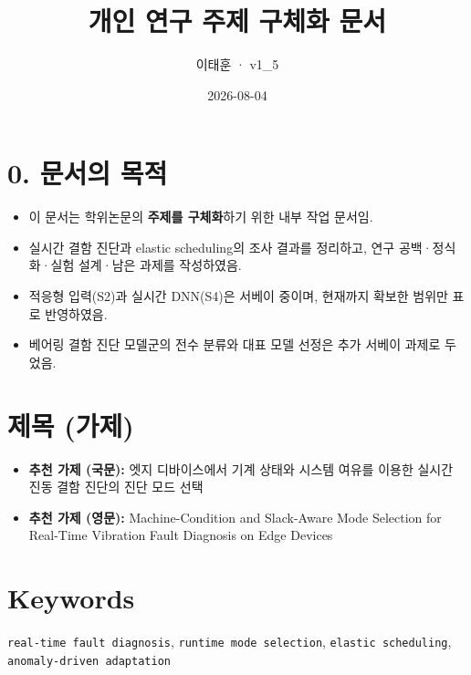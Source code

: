 \documentclass[10pt]{article}
\title{개인 연구 주제 구체화 문서}
\author{이태훈 · v1\_5}
\date{2026-08-04}
\begin{document}
\maketitle

\section*{0. 문서의 목적}
\begin{itemize}
\item 이 문서는 학위논문의 \textbf{주제를 구체화}하기 위한 내부 작업 문서임.
\item 실시간 결함 진단과 elastic scheduling의 조사 결과를 정리하고, 연구 공백·정식화·실험 설계·남은 과제를 작성하였음.
\item 적응형 입력(S2)과 실시간 DNN(S4)은 서베이 중이며, 현재까지 확보한 범위만 표로 반영하였음.
\item 베어링 결함 진단 모델군의 전수 분류와 대표 모델 선정은 추가 서베이 과제로 두었음.
\end{itemize}

\section{제목 (가제)}
\begin{itemize}
\item \textbf{추천 가제 (국문):} 엣지 디바이스에서 기계 상태와 시스템 여유를 이용한 실시간 진동 결함 진단의 진단 모드 선택
\item \textbf{추천 가제 (영문):} Machine-Condition and Slack-Aware Mode Selection for Real-Time Vibration Fault Diagnosis on Edge Devices
\end{itemize}

\section{Keywords}
\texttt{real-time fault diagnosis}, \texttt{runtime mode selection}, \texttt{elastic scheduling}, \texttt{anomaly-driven adaptation}
\end{document}
